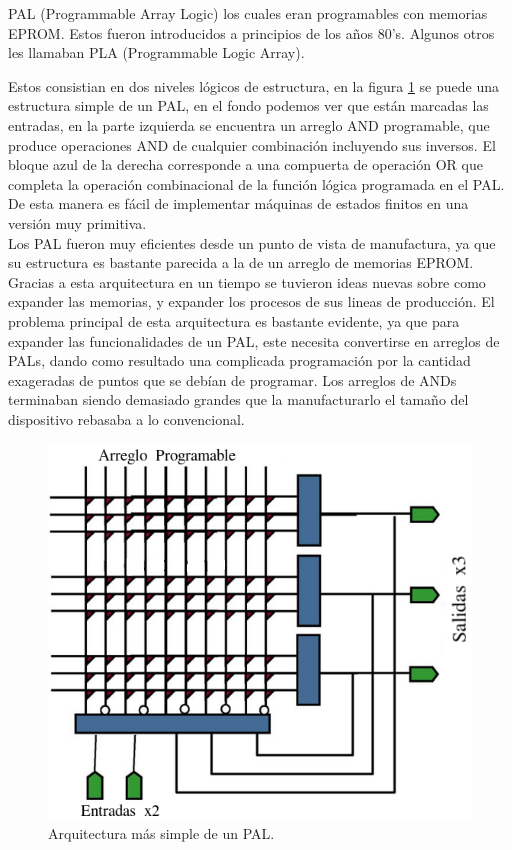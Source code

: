 \documentclass[twoside,spanish,ESP,MSc]{plantillaLabUPV}
\theoremstyle{definition}
\begin{document}
PAL (Programmable Array Logic) los cuales eran programables con memorias EPROM. Estos fueron introducidos a principios de los años 80's. Algunos otros les llamaban PLA (Programmable Logic Array).

Estos consistian en dos niveles lógicos de estructura, en la figura \ref{pal} se puede una estructura simple de un PAL, en el fondo podemos ver que están marcadas las entradas, en la parte izquierda se encuentra un arreglo AND programable, que produce operaciones AND de cualquier combinación incluyendo sus inversos. El bloque azul de la derecha corresponde a una compuerta de operación OR que completa la operación combinacional de la función lógica programada en el PAL. De esta manera es fácil de implementar máquinas de estados finitos en una versión muy primitiva.\\

Los PAL fueron muy eficientes desde un punto de vista de manufactura, ya que su estructura es bastante parecida a la de un arreglo de memorias EPROM. Gracias a esta arquitectura en un tiempo se tuvieron ideas nuevas sobre como expander las memorias, y expander los procesos de sus lineas de producción. El problema principal de esta arquitectura es bastante evidente, ya que para expander las funcionalidades de un PAL, este necesita convertirse en arreglos de PALs, dando como resultado una complicada programación por la cantidad exageradas de puntos que se debían de programar. Los arreglos de ANDs terminaban siendo demasiado grandes que la manufacturarlo el tamaño del dispositivo rebasaba a lo convencional. \\

\begin{figure}[h]
\centering
\includegraphics[scale=0.45]{ima/pal.png}
\caption{Arquitectura más simple de un PAL.}%
\label{pal}
\end{figure}
\end{document}
